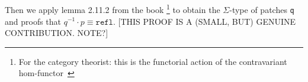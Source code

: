 \begin{code}
\AgdaSpace{}%
\AgdaSpace{}%
\AgdaSymbol{)}\AgdaSpace{}%
\AgdaSpace{}%
\AgdaSymbol{))}\<%
\\
\>[2][@{}l@{\AgdaIndent{0}}]%
\>[4]\AgdaSpace{}%
\AgdaSpace{}%
\AgdaSpace{}%
\AgdaSpace{}%
\AgdaSpace{}%
\AgdaSpace{}%
\AgdaSpace{}%
\AgdaSpace{}%
\AgdaSpace{}%
\AgdaSpace{}%
\AgdaSpace{}%
\AgdaSpace{}%
\AgdaSymbol{)}\AgdaSpace{}%
\AgdaSpace{}%
\AgdaSymbol{)}\AgdaSpace{}%
\<%
\\
%
\>[2]\AgdaSymbol{(}\AgdaFunction{Σ[}\AgdaSpace{}%
\AgdaSpace{}%
\AgdaSpace{}%
\AgdaSpace{}%
\AgdaFunction{]}\AgdaSpace{}%
\AgdaSymbol{(}\AgdaSpace{}%
\AgdaSpace{}%
\AgdaSpace{}%
\AgdaSpace{}%
\AgdaSpace{}%
\AgdaSpace{}%
\AgdaSpace{}%
\AgdaSymbol{)}\AgdaSpace{}%
\AgdaSymbol{)}\AgdaSpace{}%
\AgdaSpace{}%
\AgdaSymbol{)}\<%
\end{code}
Then we apply lemma 2.11.2 from the book
\footnote{For the category theorist: this is the functorial action of the contravariant hom-functor~\cite{hottbook}}
to obtain the $\Sigma$-type of patches \texttt{q} and proofs that $q^{-1} \cdot p \equiv \texttt{refl}$.
[THIS PROOF IS A (SMALL, BUT) GENUINE CONTRIBUTION. NOTE?]
\begin{code}[hide]%
\>[2][@{}l@{\AgdaIndent{1}}]%
\>[4]\AgdaSpace{}%
\AgdaSpace{}%
\<%
\end{code}
